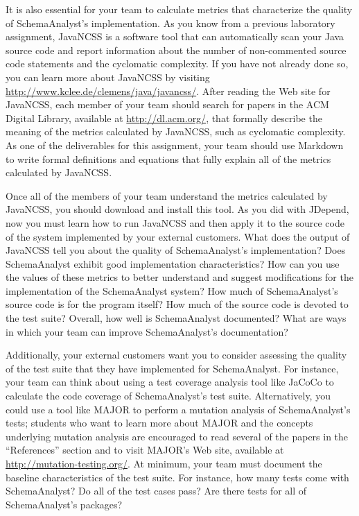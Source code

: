It is also essential for your team to calculate metrics that characterize the quality of SchemaAnalyst's implementation.
As you know from a previous laboratory assignment, JavaNCSS is a software tool that can automatically scan your Java
source code and report information about the number of non-commented source code statements and the cyclomatic
complexity.  If you have not already done so, you can learn more about JavaNCSS by visiting
\url{http://www.kclee.de/clemens/java/javancss/}. After reading the Web site for JavaNCSS, each member of your team
should search for papers in the ACM Digital Library, available at \url{http://dl.acm.org/}, that formally describe the
meaning of the metrics calculated by JavaNCSS, such as cyclomatic complexity. As one of the deliverables for this
assignment, your team should use Markdown to write formal definitions and equations that fully explain all of the
metrics calculated by JavaNCSS.

Once all of the members of your team understand the metrics calculated by JavaNCSS, you should download and install this
tool.  As you did with JDepend, now you must learn how to run JavaNCSS and then apply it to the source code of the
system implemented by your external customers.  What does the output of JavaNCSS tell you about the quality of
SchemaAnalyst's implementation? Does SchemaAnalyst exhibit good implementation characteristics? How can you use the
values of these metrics to better understand and suggest modifications for the implementation of the SchemaAnalyst
system? How much of SchemaAnalyst's source code is for the program itself? How much of the source code is devoted to the
test suite?  Overall, how well is SchemaAnalyst documented? What are ways in which your team can improve SchemaAnalyst's
documentation?

Additionally, your external customers want you to consider assessing the quality of the test suite that they have
implemented for SchemaAnalyst. For instance, your team can think about using a test coverage analysis tool like JaCoCo
to calculate the code coverage of SchemaAnalyst's test suite. Alternatively, you could use a tool like MAJOR to perform
a mutation analysis of SchemaAnalyst's tests; students who want to learn more about MAJOR and the concepts underlying
mutation analysis are encouraged to read several of the papers in the ``References'' section and to visit MAJOR's Web
site, available at \url{http://mutation-testing.org/}. At minimum, your team must document the baseline characteristics
of the test suite. For instance, how many tests come with SchemaAnalyst? Do all of the test cases pass?  Are there tests
for all of SchemaAnalyst's packages?

